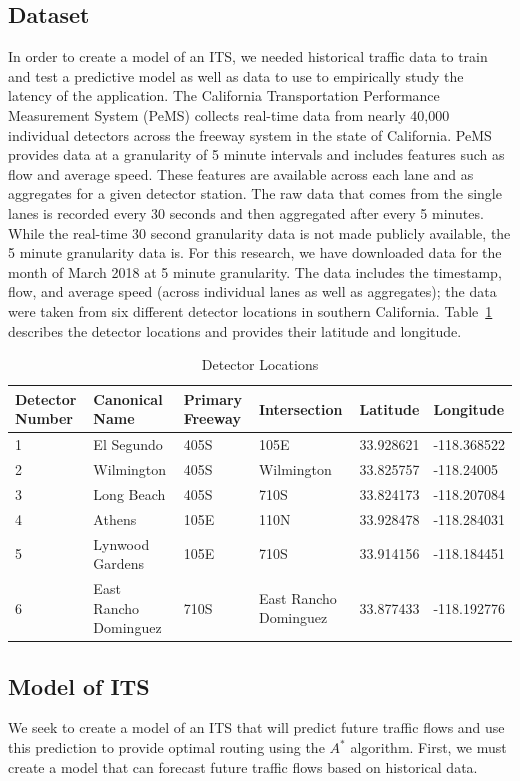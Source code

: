 \documentclass{article}
\begin{document}
\subsection{Dataset}
In order to create a model of an ITS, we needed historical traffic data to train and test a predictive model as well as data to use to empirically study the latency of the application. The California Transportation Performance Measurement System (PeMS) collects real-time data from nearly 40,000 individual detectors across the freeway system in the state of California. PeMS provides data at a granularity of 5 minute intervals and includes features such as flow and average speed. These features are available across each lane and as aggregates for a given detector station. The raw data that comes from the single lanes is recorded every 30 seconds and then aggregated after every 5 minutes. While the real-time 30 second granularity data is not made publicly available, the 5 minute granularity data is. For this research, we have downloaded data for the month of March 2018 at 5 minute granularity. The data includes the timestamp, flow, and average speed (across individual lanes as well as aggregates); the data were taken from six different detector locations in southern California. Table~\ref{tab:detectors} describes the detector locations and provides their latitude and longitude.  
\begin{table}[ht]
 \caption{Detector Locations}
  \centering
  \begin{tabular}{llllll}
    Detector Number     & Canonical Name & Primary Freeway     & Intersection  & Latitude &  Longitude\\
    \midrule
    1 & El Segundo & 405S   & 105E   & 	33.928621 &	-118.368522\\
    2 & Wilmington & 405S & Wilmington   & 	33.825757 &	-118.24005\\
    3 & Long Beach & 405S & 710S   & 	33.824173 &	-118.207084\\
    4 & Athens & 105E   & 110N   & 	33.928478 &	-118.284031\\
    5 & Lynwood Gardens & 105E & 710S   &	33.914156 &	-118.184451\\
    6 & East Rancho Dominguez & 710S   & East Rancho Dominguez & 	33.877433 &	-118.192776\\


  \end{tabular}
  \label{tab:detectors}
\end{table}
\subsection{Model of ITS}
We seek to create a model of an ITS that will predict future traffic flows and use this prediction to provide optimal routing using the $A^{*}$ algorithm. First, we must create a model that can forecast future traffic flows based on historical data.
\end{document}
